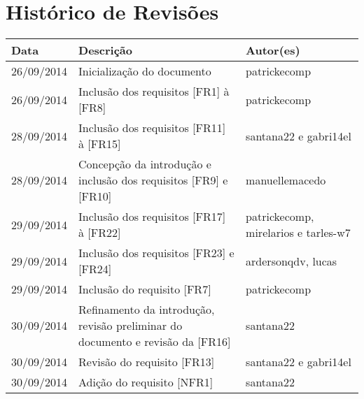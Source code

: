 \documentclass{article}
\begin{document}
\capa

\newpage

\section*{\center Histórico de Revisões}
  \vspace*{1cm}
  \begin{table}[ht]
    \centering
    \begin{tabular}[pos]{|m{2cm} | m{7.2cm} | m{3.8cm}|} 
      \hline
      \cellcolor[gray]{0.9}
      \textbf{Data} & \cellcolor[gray]{0.9}\textbf{Descrição} & \cellcolor[gray]{0.9}\textbf{Autor(es)}\\ \hline
      \hline
      \small 26/09/2014 & \small Inicialização do documento & \small patrickecomp \\ \hline      
      \small 26/09/2014 & \small Inclusão dos requisitos [FR1] à [FR8] & \small patrickecomp \\ \hline 
      \small 28/09/2014 & \small Inclusão dos requisitos [FR11] à [FR15] & \small santana22 e gabri14el \\ \hline
      \small 28/09/2014 & \small Concepção da introdução e inclusão dos requisitos [FR9] e [FR10] & \small manuellemacedo \\ \hline 
      \small 29/09/2014 & \small Inclusão dos requisitos [FR17] à [FR22] & \small patrickecomp, mirelarios e tarles-w7 \\ \hline   
      \small 29/09/2014 & \small Inclusão dos requisitos [FR23] e [FR24] & \small ardersonqdv, lucas \\ \hline 
      \small 29/09/2014 & \small Inclusão do requisito [FR7] & \small patrickecomp \\ \hline 
      \small 30/09/2014 & \small Refinamento da introdução,  revisão preliminar do documento e revisão da [FR16] & \small santana22 \\ \hline
      \small 30/09/2014 & \small Revisão do requisito [FR13] & \small santana22 e gabri14el \\ \hline
      \small 30/09/2014 & \small Adição do requisito [NFR1] & \small santana22 \\ \hline
    \end{tabular}
  \end{table}
\end{document}

